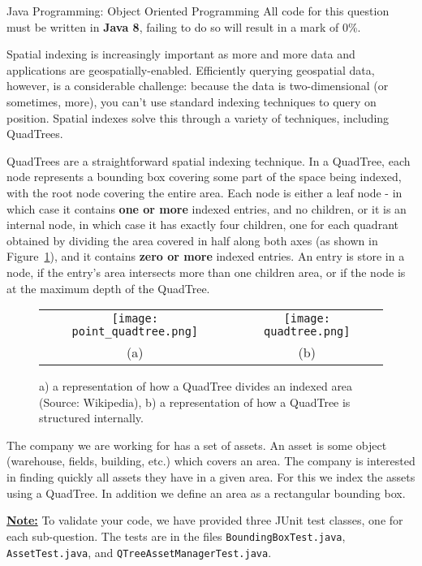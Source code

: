 \documentclass[final]{UoYClosedExam}
\begin{document}
\newpage
\begin{question}{40}{Java Programming: Object Oriented Programming}
{All code for this question must be written in \textbf{Java 8}, failing to do so will result in a mark of 0\%.}\vspace{3mm}

Spatial indexing is increasingly important as more and more data and applications are geospatially-enabled. Efficiently querying geospatial data, however, is a considerable challenge: because the data is two-dimensional (or sometimes, more), you can't use standard indexing techniques to query on position. Spatial indexes solve this through a variety of techniques, including  QuadTrees.

QuadTrees are a straightforward spatial indexing technique. In a QuadTree, each node represents a bounding box covering some part of the space being indexed, with the root node covering the entire area. Each node is either a leaf node - in which case it contains {\bfseries one or more} indexed entries, and no children, or it is an internal node, in which case it has exactly four children, one for each quadrant obtained by dividing the area covered in half along both axes (as shown in Figure~\ref{fig:quadtree}), and it contains {\bfseries zero or more} indexed entries. An entry is store in a node, if the entry's area intersects more than one children area, or if the node is at the maximum depth of the QuadTree.

\begin{figure}[bht]%
\begin{tabular}{cc}
\texttt{[image: point\_quadtree.png]} &
\texttt{[image: quadtree.png]} \\
(a) & (b)
\end{tabular}
\caption{a) a representation of how a QuadTree divides an indexed area (Source: Wikipedia), b) a representation of how a QuadTree is structured internally.}%
\label{fig:quadtree}%
\end{figure}

The company we are working for has a set of assets. An asset is some object (warehouse, fields, building, etc.) which covers an area. The company is interested in finding quickly all assets they have in a given area. For this we index the assets using a QuadTree. In addition we define an area as a rectangular bounding box.

\newpage

\underline{{\bfseries Note:}} To validate your code, we have provided three JUnit test classes, one for each sub-question. The tests are in the files \verb|BoundingBoxTest.java|, \verb|AssetTest.java|, and \verb|QTreeAssetManagerTest.java|.



\end{question}
\end{document}
